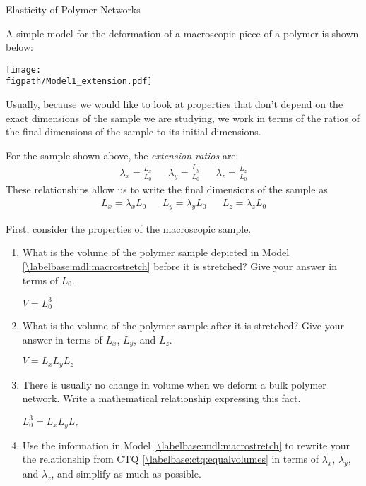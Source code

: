 \begin{activity}{Elasticity of Polymer Networks}
\begin{model}
	A simple model for the deformation of a macroscopic piece of a polymer is shown below:
	
	\vspace{6pt}
	\centerline{\texttt{[image: \\figpath/Model1\_extension.pdf]}}
	
	Usually, because we would like to look at properties that don't depend on the exact dimensions of the sample we are studying, we work in terms of the ratios of the final dimensions of the sample to its initial dimensions.
	
	For the sample shown above, the \emph{extension ratios} are:
	\begin{align*}
		\lambda_x = \frac{L_x}{L_0} && \lambda_y = \frac{L_y}{L_0} && \lambda_z = \frac{L_z}{L_0}
	\end{align*}
	These relationships allow us to write the final dimensions of the sample as
	\begin{align*}
		L_x = \lambda_x L_0 && L_y = \lambda_y L_0 && L_z = \lambda_z L_0
	\end{align*}
	
\end{model}


\begin{ctqs}

	\question First, consider the properties of the macroscopic sample.
	
		\begin{enumerate}
		
			\item What is the volume of the polymer sample depicted in Model \ref{\labelbase:mdl:macrostretch} before it is stretched?  Give your answer in terms of $L_0$.
	
		\begin{solution}[0.75in]{}
		
			$V = L_0^3$
		\end{solution}
	
			\item What is the volume of the polymer sample after it is stretched? Give your answer in terms of $L_x$, $L_y$, and $L_z$.
	
		\begin{solution}[0.75in]{}
		
			$V = L_x L_y L_z$
		\end{solution}
	
			\item There is usually no change in volume when we deform a bulk polymer network.  Write a mathematical relationship expressing this fact.
		\label{\labelbase:ctq:equalvolumes}
		\begin{solution}[0.75in]{}
			$L_0^3 = L_x L_y L_z$
		\end{solution}
			\item Use the information in Model \ref{\labelbase:mdl:macrostretch} to rewrite your the relationship from CTQ \ref{\labelbase:ctq:equalvolumes} in terms of $\lambda_x$, $\lambda_y$, and $\lambda_z$, and simplify as much as possible. \label{\labelbase:ctq:equalvolumes2}
	

\end{enumerate}
\end{ctqs}
\end{activity}
